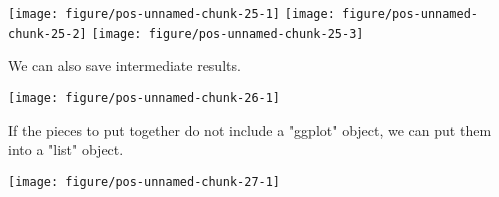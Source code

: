\documentclass[paper=a4,10pt,div=17,headsepline,BCOR=12mm,twoside,open=right]{scrbook}\usepackage{knitr}
\begin{document}
\begin{knitrout}\footnotesize
{}\color{fgcolor}\begin{kframe}
\begin{alltt}
 \hlopt{+}  \hlopt{+} \hlstd{(}\hlstd{)}
 \hlopt{+}  \hlopt{+} \hlstd{(}\hlstd{)} \hlopt{+} \hlstd{(}\hlstd{,} \hlstd{)}
\end{alltt}
\end{kframe}

{\centering \texttt{[image: figure/pos-unnamed-chunk-25-1]} 
\texttt{[image: figure/pos-unnamed-chunk-25-2]} 
\texttt{[image: figure/pos-unnamed-chunk-25-3]} 

}



\end{knitrout}

We can also save intermediate results.

\begin{knitrout}\footnotesize
{}\color{fgcolor}\begin{kframe}
\begin{alltt}
 \hlkwb{<-}  \hlopt{+} \hlstd{(}\hlstd{=}\hlstd{(}\hlstd{,}\hlstd{))}
 \hlopt{+}  \hlopt{+} \hlstd{(}\hlstd{)}
\end{alltt}
\end{kframe}

{\centering \texttt{[image: figure/pos-unnamed-chunk-26-1]} 

}



\end{knitrout}

If the pieces to put together do not include a "ggplot" object, we can put them
into a "list" object.

\begin{knitrout}\footnotesize
{}\color{fgcolor}\begin{kframe}
\begin{alltt}
 \hlkwb{<-}  \hlstd{(}\hlstd{))}
 \hlopt{+} 
\end{alltt}
\end{kframe}

{\centering \texttt{[image: figure/pos-unnamed-chunk-27-1]} 

}



\end{knitrout}
\end{document}

